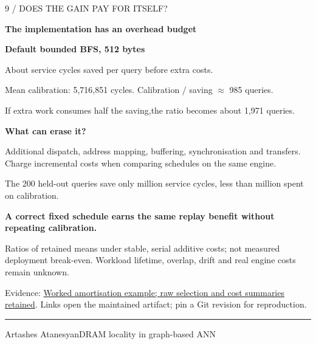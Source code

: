 \documentclass[11pt]{article}
\newenvironment{slide}[2]{%
  \clearpage\color{ink}\fontsize{14}{18}\selectfont
  {\fontsize{10}{12}\selectfont\color{accent}\MakeUppercase{#1}\par}
  {\fontsize{25}{29}\selectfont\bfseries #2\par}\vspace{4pt}
}{%
  \vfill{\color{accent}\hrule}\vspace{4pt}
  {\fontsize{9}{11}\selectfont\color{muted}Artashes Atanesyan\hfill DRAM locality in graph-based ANN\hfill\thepage\par}
}
\newcommand{\takeaway}[1]{\par\vspace{3pt}\colorbox{wash}{\parbox{\dimexpr\linewidth-2\fboxsep\relax}{\strut\textbf{#1}\strut}}\par}
\newcommand{\evidence}[2]{\vfill{\fontsize{9}{11}\selectfont\color{muted}Evidence: \href{https://github.com/senqx/Thesis-PIM-ANN/blob/main/#1}{#2}. Links open the maintained artifact; pin a Git revision for reproduction.\par}}
\begin{document}
\begin{slide}{9 / Does the gain pay for itself?}{The implementation has an overhead budget}
\begin{minipage}[t]{0.48\linewidth}
\textbf{Default bounded BFS, 512 bytes}\par
About \RoundRobinBFSSavedFloat{} service cycles saved per query before extra costs.\par
Mean calibration: 5,716,851 cycles.\newline
Calibration / saving $\approx$ 985 queries.\par
If extra work consumes half the saving,\newline the ratio becomes about 1,971 queries.
\end{minipage}\hfill
\begin{minipage}[t]{0.48\linewidth}
\textbf{What can erase it?}\par
Additional dispatch, address mapping, buffering, synchronisation and transfers. Charge incremental costs when comparing schedules on the same engine.\par
The 200 held-out queries save only million service cycles, less than million spent on calibration.
\end{minipage}
\takeaway{A correct fixed schedule earns the same replay benefit without repeating calibration.}
{\fontsize{12}{15}\selectfont Ratios of retained means under stable, serial additive costs; not measured deployment break-even. Workload lifetime, overlap, drift and real engine costs remain unknown.\par}
\evidence{doc/profiled_fetch_results.tex}{Worked amortisation example; raw selection and cost summaries retained}
\end{slide}
\end{document}
